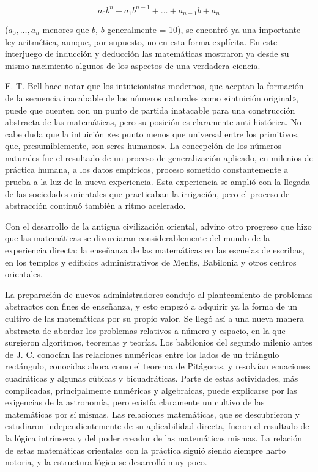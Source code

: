 \documentclass[a4paper, 12pt]{article}
\begin{document}
\[ a_0b^n + a_1b^{n-1} + \dots + a_{n-1}b + a_n  \]

\noindent ($a_0, \dots,a_n$ menores que $b$, $b$ generalmente = 10), se encontró
ya una importante ley aritmética, aunque, por supuesto, no en esta forma
explícita. En este interjuego de inducción y deducción las matemáticas mostraron
ya desde su mismo nacimiento algunos de los aspectos de una verdadera ciencia.

E. T. Bell hace notar que los intuicionistas modernos, que aceptan la formación
de la secuencia inacabable de los números naturales como «intuición original»,
puede que cuenten con un punto de partida inatacable para una construcción
abstracta de las matemáticas, pero su posición es claramente anti-histórica. No
cabe duda que la intuición «es punto menos que universal entre los primitivos,
que, presumiblemente, son seres humanos». La concepción de los números naturales
fue el resultado de un proceso de generalización aplicado, en milenios de
práctica humana, a los datos empíricos, proceso sometido constantemente a prueba
a la luz de la nueva experiencia. Esta experiencia se amplió con la llegada de
las sociedades orientales que practicaban la irrigación, pero el proceso de
abstracción continuó también a ritmo acelerado.

Con el desarrollo de la antigua civilización oriental, advino otro progreso que
hizo que las matemáticas se divorciaran considerablemente del mundo de la
experiencia directa: la enseñanza de las matemáticas en las escuelas de
escribas, en los templos y edificios administrativos de Menfis, Babilonia y
otros centros orientales.

La preparación de nuevos administradores condujo al planteamiento de problemas
abstractos con fines de enseñanza, y esto empezó a adquirir ya la forma de un
cultivo de las matemáticas por su propio valor. Se llegó así a una nueva manera
abstracta de abordar los problemas relativos a número y espacio, en la que
surgieron algoritmos, teoremas y teorías. Los babilonios del segundo milenio
antes de J. C. conocían las relaciones numéricas entre los lados de un triángulo
rectángulo, conocidas ahora como el teorema de Pitágoras, y resolvían ecuaciones
cuadráticas y algunas cúbicas y bicuadráticas. Parte de estas actividades, más
complicadas, principalmente numéricas y algebraicas, puede explicarse por las
exigencias de la astronomía, pero existía claramente un cultivo de las
matemáticas por sí mismas. Las relaciones matemáticas, que se descubrieron y
estudiaron independientemente de su aplicabilidad directa, fueron el resultado
de la lógica intrínseca y del poder creador de las matemáticas mismas. La
relación de estas matemáticas orientales con la práctica siguió siendo siempre
harto notoria, y la estructura lógica se desarrolló muy poco.
\end{document}
